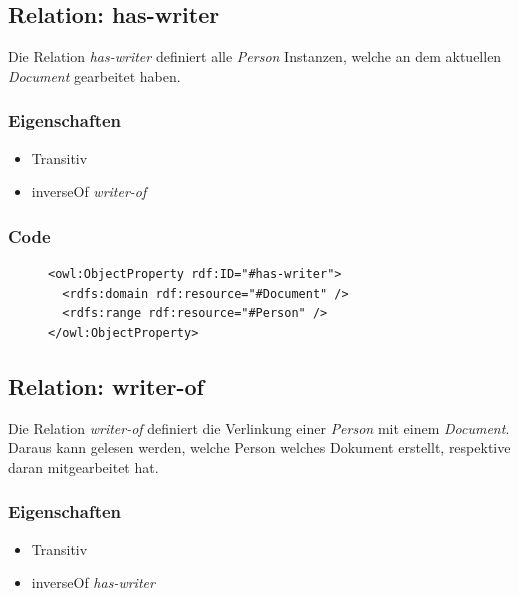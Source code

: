 \documentclass[
    11pt,
    latin1,
    a4paper,
    oneside
]{scrreprt}
\begin{document}
\subsection{Relation: has-writer} \label{sec:rel_haswriter}

Die Relation \emph{has-writer} definiert alle \emph{Person} Instanzen, welche an dem aktuellen \emph{Document} gearbeitet haben.

\subsubsection{Eigenschaften} \label{sec:rel_haswriter_settings}

\begin{itemize}
  \item Transitiv
  \item inverseOf \emph{writer-of}
\end{itemize}

\subsubsection{Code} \label{sec:rel_haswriter_code}

\begin{figure}[H]
 \lstset{language=XML}
 \begin{lstlisting}[label=owl:haswriter,caption={Die Relation \emph{has-writer} gibt an, welche \emph{Person} an dem \emph{Document} geschrieben hat}]
<owl:ObjectProperty rdf:ID="#has-writer">
  <rdfs:domain rdf:resource="#Document" />
  <rdfs:range rdf:resource="#Person" />
</owl:ObjectProperty>
 \end{lstlisting}
\end{figure}


\subsection{Relation: writer-of} \label{sec:rel_writerof}

Die Relation \emph{writer-of} definiert die Verlinkung einer \emph{Person} mit einem \emph{Document}. Daraus kann gelesen werden, welche Person welches Dokument erstellt, respektive daran mitgearbeitet hat.

\subsubsection{Eigenschaften} \label{sec:rel_writerof_settings}

\begin{itemize}
  \item Transitiv
  \item inverseOf \emph{has-writer}
\end{itemize}
\end{document}
